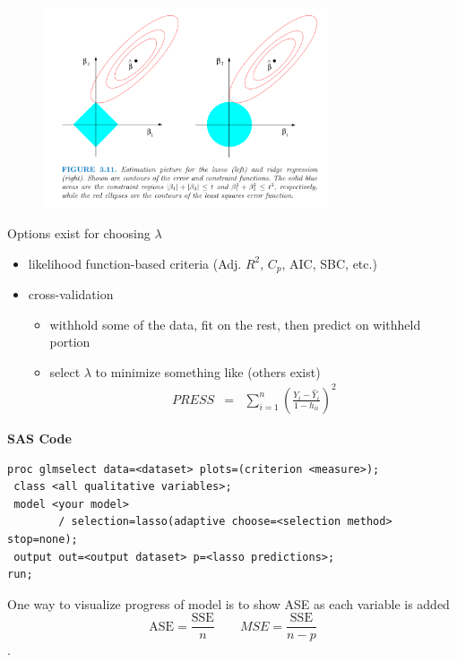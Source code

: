\documentclass[12pt]{notes}
\begin{document}
\begin{figure}[H]
\centering
\includegraphics[width = 0.75\textwidth]{figures/module4/lasso.png}
\end{figure}

Options exist for choosing $\lambda$ 
\begin{itemize}
  \item likelihood function-based criteria (Adj. $R^2$, $C_p$, AIC, SBC, etc.)
  \item cross-validation
    \begin{itemize}
      \item withhold some of the data, fit on the rest, then predict on withheld portion
      \item select $\lambda$ to minimize something like (others exist)
        \begin{eqnarray}
          PRESS & = & \sum_{i=1}^{n} \left( \frac{Y_i - \hat{Y}_i }{1 - h_{ii}} \right)^2 \nonumber
        \end{eqnarray}
    \end{itemize}
\end{itemize}

\nspace
\textbf{SAS Code}
\begin{verbatim}
proc glmselect data=<dataset> plots=(criterion <measure>);
 class <all qualitative variables>;
 model <your model>
        / selection=lasso(adaptive choose=<selection method> stop=none);
 output out=<output dataset> p=<lasso predictions>;
run;
\end{verbatim}


One way to visualize progress of model is to show ASE as each variable is added\\ \vspace{4em}
$$\text{ASE} = \frac{\text{SSE}}{n} \qquad MSE = \frac{\text{SSE}}{n-p}$$. 
\end{document}
